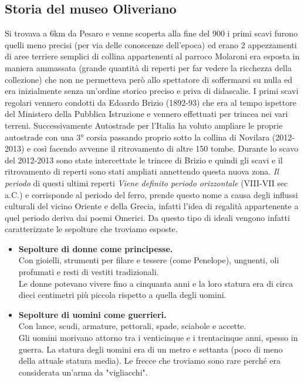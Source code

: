 \documentclass[hidelinks,12pt,a4paper]{article}
\begin{document}
\begin{flushleft}
		\section{Storia del museo Oliveriano}
		Si trovava a 6km da Pesaro e venne scoperta alla fine del 900 i primi scavi furono quelli meno precisi (per via delle conoscenze dell'epoca) ed erano 2 appezzamenti di aree terriere semplici di collina appartenenti al parroco Molaroni era esposta in maniera ammassata (grande quantità di reperti per far vedere la ricchezza della collezione) che non ne permetteva però allo spettatore di soffermarsi su nulla ed era inizialmente senza un’ordine storico preciso e priva di didascalie. I primi scavi regolari vennero condotti da Edoardo Brizio (1892-93) che era al tempo ispettore del Ministero della Pubblica Istruzione e vennero effettuati per trincea nei vari terreni. Successivamente Autostrade per l’Italia ha voluto ampliare le proprie autostrade con una 3° corsia passando proprio sotto la collina di Novilara (2012-2013) e così facendo avvenne il ritrovamento di altre 150 tombe. Durante lo scavo del 2012-2013 sono state intercettate le trincee di Brizio e quindi gli scavi e il ritrovamento di reperti sono stati ampliati annettendo questa nuova zona. \textit{Il periodo} di questi ultimi reperti \textit{Viene definito periodo orizzontale} (VIII-VII sec a.C.) e corrisponde al periodo del ferro, prende questo nome a causa degli influssi culturali del vicino Oriente e della Grecia, infatti l’idea di regalità appartenente a quel periodo deriva dai poemi Omerici. Da questo tipo di ideali vengono infatti caratterizzate le sepolture che troviamo esposte.
		\begin{itemize}
			\item \textbf{Sepolture di donne come principesse.}\\
			Con gioielli, strumenti per filare e tessere (come Penelope), unguenti, oli profumati e resti di vestiti tradizionali.\\
			Le donne potevano vivere fino a cinquanta anni e la loro statura era di circa dieci centimetri più piccola rispetto a quella degli uomini.
			
			\item \textbf{Sepolture di uomini come guerrieri.}\\
			Con lance, scudi, armature, pettorali, spade, sciabole e accette.\\
			Gli uomini morivano attorno tra i venticinque e i trentacinque anni, spesso in guerra. La statura degli uomini era di un metro e settanta (poco di meno della attuale statura media). Le frecce che troviamo sono rare perché era considerata un'arma da "vigliacchi".
			

\end{itemize}
\end{flushleft}
\end{document}
